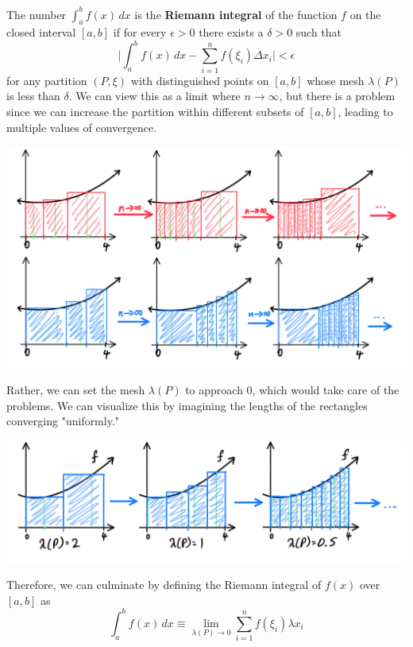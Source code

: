     \begin{definition}
      The number $\int_a^b f(x)\,dx$ is the \textbf{Riemann integral} of the function $f$ on the closed interval $[a, b]$ if for every $\epsilon>0$ there exists a $\delta>0$ such that
      \[\Bigg| \int_a^b f(x)\,dx - \sum_{i=1}^n f(\xi_i) \Delta x_i \Bigg| < \epsilon\]
      for any partition $(P, \xi)$ with distinguished points on $[a, b]$ whose mesh $\lambda(P)$ is less than $\delta$. We can view this as a limit where $n \rightarrow \infty$, but there is a problem since we can increase the partition within different subsets of $[a,b]$, leading to multiple values of convergence. 
      \begin{center}
          \includegraphics[scale=0.28]{img/Riemann_Integral_Converging_onto_2_Numbers.PNG}
      \end{center}
      Rather, we can set the mesh $\lambda(P)$ to approach $0$, which would take care of the problems. We can visualize this by imagining the lengths of the rectangles converging "uniformly."
      \begin{center}
          \includegraphics[scale=0.28]{img/Riemann_Integral_Limit_Mesh_goes_to_0.PNG}
      \end{center}
      Therefore, we can culminate by defining the Riemann integral of $f(x)$ over $[a,b]$ as 
      \[\int_a^b f(x)\,dx \equiv \lim_{\lambda(P) \rightarrow 0} \sum_{i=1}^n f(\xi_i) \lambda x_i\]
    \end{definition}

